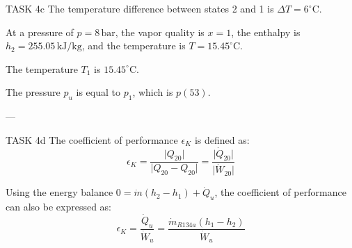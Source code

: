 TASK 4c  
The temperature difference between states 2 and 1 is \( \Delta T = 6^\circ\text{C} \).  

At a pressure of \( p = 8 \, \text{bar} \), the vapor quality is \( x = 1 \), the enthalpy is \( h_2 = 255.05 \, \text{kJ/kg} \), and the temperature is \( T = 15.45^\circ\text{C} \).  

The temperature \( T_1 \) is \( 15.45^\circ\text{C} \).  

The pressure \( p_u \) is equal to \( p_1 \), which is \( p(53) \).  

---

TASK 4d  
The coefficient of performance \( \epsilon_K \) is defined as:  
\[
\epsilon_K = \frac{\lvert Q_{20} \rvert}{\lvert Q_{20} - Q_{20} \rvert} = \frac{\lvert \dot{Q}_{20} \rvert}{\lvert \dot{W}_{20} \rvert}
\]  

Using the energy balance \( 0 = \dot{m}(h_2 - h_1) + \dot{Q}_u \), the coefficient of performance can also be expressed as:  
\[
\epsilon_K = \frac{\dot{Q}_u}{\dot{W}_u} = \frac{\dot{m}_{R134a}(h_1 - h_2)}{\dot{W}_u}
\]